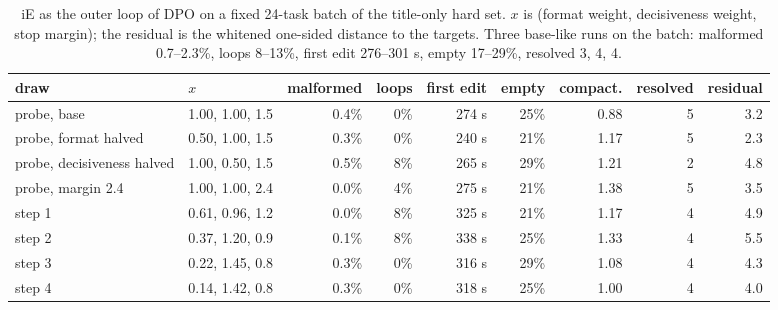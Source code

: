 \documentclass[11pt]{article}
\begin{document}
\begin{table}[t]
\centering\footnotesize
\caption{iE as the outer loop of DPO on a fixed 24-task batch of the title-only hard set. $x$ is (format weight, decisiveness weight, stop margin); the residual is the whitened one-sided distance to the targets. Three base-like runs on the batch: malformed 0.7--2.3\%, loops 8--13\%, first edit 276--301 s, empty 17--29\%, resolved 3, 4, 4.}
\label{tab:ietrain}
\setlength{\tabcolsep}{3.5pt}
\begin{tabular}{llrrrrrrr}
\toprule
draw & $x$ & malformed & loops & first edit & empty & compact. & resolved & residual \\
\midrule
probe, base & 1.00, 1.00, 1.5 & 0.4\% & 0\% & 274 s & 25\% & 0.88 & 5 & 3.2 \\
probe, format halved & 0.50, 1.00, 1.5 & 0.3\% & 0\% & 240 s & 21\% & 1.17 & 5 & 2.3 \\
probe, decisiveness halved & 1.00, 0.50, 1.5 & 0.5\% & 8\% & 265 s & 29\% & 1.21 & 2 & 4.8 \\
probe, margin 2.4 & 1.00, 1.00, 2.4 & 0.0\% & 4\% & 275 s & 21\% & 1.38 & 5 & 3.5 \\
step 1 & 0.61, 0.96, 1.2 & 0.0\% & 8\% & 325 s & 21\% & 1.17 & 4 & 4.9 \\
step 2 & 0.37, 1.20, 0.9 & 0.1\% & 8\% & 338 s & 25\% & 1.33 & 4 & 5.5 \\
step 3 & 0.22, 1.45, 0.8 & 0.3\% & 0\% & 316 s & 29\% & 1.08 & 4 & 4.3 \\
step 4 & 0.14, 1.42, 0.8 & 0.3\% & 0\% & 318 s & 25\% & 1.00 & 4 & 4.0 \\
\bottomrule
\end{tabular}
\end{table}
\end{document}
